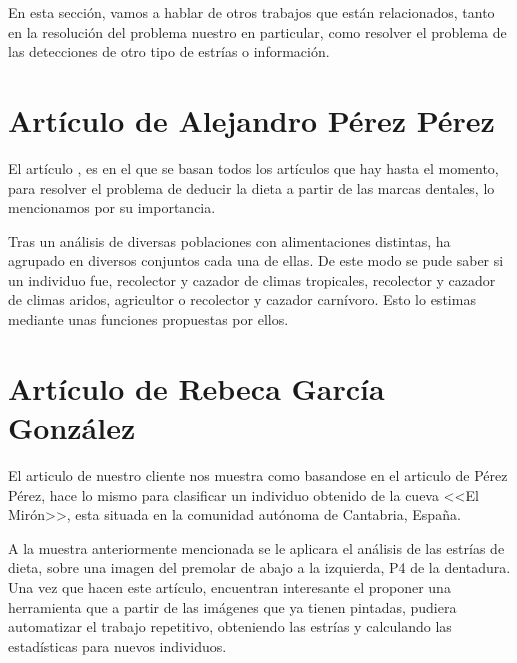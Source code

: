 
En esta sección, vamos a hablar de otros trabajos que están relacionados, tanto en la resolución del problema nuestro en particular, como resolver el problema de las detecciones de otro tipo de estrías o información.

\section{Artículo de Alejandro Pérez Pérez}
El artículo \cite{Lalueza:perez}, es en el que se basan todos los artículos que hay hasta el momento, para resolver el problema de deducir la dieta a partir de las marcas dentales, lo mencionamos por su importancia.

Tras un análisis de diversas poblaciones con alimentaciones distintas, ha agrupado en diversos conjuntos cada una de ellas. De este modo se pude saber si un individuo fue, recolector y cazador de climas tropicales, recolector y cazador de climas aridos, agricultor o recolector y cazador carnívoro.
Esto lo estimas mediante unas funciones propuestas por ellos.

\section{Artículo de Rebeca García González}
El articulo \cite{Rebeca:garcia} de nuestro cliente nos muestra como basandose en el articulo \cite{Lalueza:perez} de Pérez Pérez, hace lo mismo para clasificar un individuo obtenido de la cueva <<El Mirón>>, esta situada en la comunidad autónoma de Cantabria, España.

A la muestra anteriormente mencionada se le aplicara el análisis de las estrías de dieta, sobre una imagen del premolar de abajo a la izquierda, P4 de la dentadura. 
Una vez que hacen este artículo, encuentran interesante el proponer una herramienta que a partir de las imágenes que ya tienen pintadas, pudiera automatizar el trabajo repetitivo, obteniendo las estrías y calculando las estadísticas para nuevos individuos.


